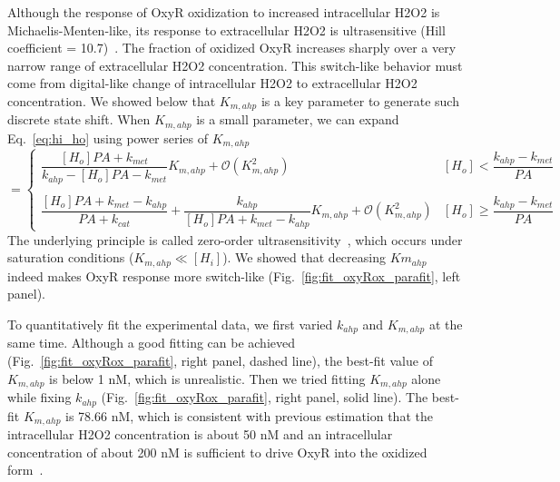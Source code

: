 \documentclass[11pt]{article}
\begin{document}
Although the response of OxyR oxidization to increased intracellular H2O2 is Michaelis-Menten-like, its response to extracellular H2O2 is ultrasensitive (Hill coefficient = 10.7)~\cite{pillay2016quantitative}. The fraction of oxidized OxyR increases sharply over a very narrow range of extracellular H2O2 concentration. This switch-like behavior must come from digital-like change of intracellular H2O2 to extracellular H2O2 concentration. We showed below that $K_{m,ahp}$ is a key parameter to generate such discrete state shift. When $K_{m,ahp}$ is a small parameter, we can expand Eq.~\ref{eq:hi_ho} using power series of $K_{m,ahp}$
\begin{equation*}
[H_i] = \begin{cases}
\dfrac{[H_o]PA+k_{met}}{k_{ahp}-[H_o]PA-k_{met}}K_{m,ahp} + \mathcal{O}(K_{m,ahp}^2) & \text{$[H_o]<\dfrac{k_{ahp}-k_{met}}{PA}$}\\
\\
\dfrac{[H_o]PA+k_{met}-k_{ahp}}{PA+k_{cat}} + \dfrac{k_{ahp}}{[H_o]PA+k_{met}-k_{ahp}}K_{m,ahp} + \mathcal{O}(K_{m,ahp}^2) &  \text{$[H_o]\ge\dfrac{k_{ahp}-k_{met}}{PA}$}
\end{cases}
\end{equation*}
The underlying principle is called zero-order ultrasensitivity~\cite{ferrell2014ultrasensitivity}, which occurs under saturation conditions ($K_{m,ahp}\ll[H_i]$). We showed that decreasing $Km_{ahp}$ indeed makes OxyR response more switch-like (Fig.~\ref{fig:fit_oxyRox_parafit}, left panel).

To quantitatively fit the experimental data, we first varied $k_{ahp}$ and $K_{m,ahp}$ at the same time. Although a good fitting can be achieved (Fig.~\ref{fig:fit_oxyRox_parafit}, right panel, dashed line), the best-fit value of $K_{m,ahp}$ is below 1 nM, which is unrealistic. Then we tried fitting $K_{m,ahp}$ alone while fixing $k_{ahp}$ (Fig.~\ref{fig:fit_oxyRox_parafit}, right panel, solid line). The best-fit $K_{m,ahp}$ is 78.66 nM, which is consistent with previous estimation that the intracellular H2O2 concentration is about 50 nM and an intracellular concentration of about 200 nM is sufficient to drive OxyR into the oxidized form~\cite{imlay2013molecular}.
\end{document}
